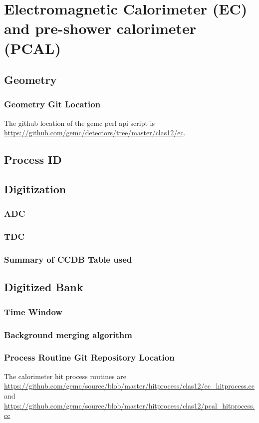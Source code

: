 \section{Electromagnetic Calorimeter (EC) and pre-shower calorimeter (PCAL)}

\subsection{Geometry}

\subsubsection{Geometry Git Location}
The github location of the gemc perl api script is \url{https://github.com/gemc/detectors/tree/master/clas12/ec}.

\subsection{Process ID}

\subsection{Digitization}


\subsubsection{ADC}
\subsubsection{TDC}

\subsubsection{Summary of CCDB Table used}

\subsection{Digitized Bank}

\subsubsection{Time Window}

\subsubsection{Background merging algorithm}

\subsubsection{Process Routine Git Repository Location}
The calorimeter hit process routines are \url{https://github.com/gemc/source/blob/master/hitprocess/clas12/ec_hitprocess.cc} and
\url{https://github.com/gemc/source/blob/master/hitprocess/clas12/pcal_hitprocess.cc}

